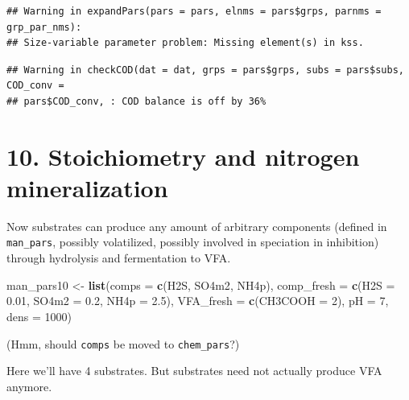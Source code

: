 \documentclass[
]{article}
\newenvironment{Shaded}{\begin{snugshade}}{\end{snugshade}}
\newcommand{\AttributeTok}[1]{\textcolor[rgb]{0.13,0.29,0.53}{#1}}
\newcommand{\DecValTok}[1]{\textcolor[rgb]{0.00,0.00,0.81}{#1}}
\newcommand{\FloatTok}[1]{\textcolor[rgb]{0.00,0.00,0.81}{#1}}
\newcommand{\FunctionTok}[1]{\textcolor[rgb]{0.13,0.29,0.53}{\textbf{#1}}}
\newcommand{\NormalTok}[1]{#1}
\newcommand{\OtherTok}[1]{\textcolor[rgb]{0.56,0.35,0.01}{#1}}
\newcommand{\StringTok}[1]{\textcolor[rgb]{0.31,0.60,0.02}{#1}}
\begin{document}
\begin{verbatim}
## Warning in expandPars(pars = pars, elnms = pars$grps, parnms = grp_par_nms):
## Size-variable parameter problem: Missing element(s) in kss.
\end{verbatim}

\begin{verbatim}
## Warning in checkCOD(dat = dat, grps = pars$grps, subs = pars$subs, COD_conv =
## pars$COD_conv, : COD balance is off by 36%
\end{verbatim}

\hypertarget{stoichiometry-and-nitrogen-mineralization}{%
\section{10. Stoichiometry and nitrogen
mineralization}\label{stoichiometry-and-nitrogen-mineralization}}

Now substrates can produce any amount of arbitrary components (defined
in \texttt{man\_pars}, possibly volatilized, possibly involved in
speciation in inhibition) through hydrolysis and fermentation to VFA.

\begin{Shaded}
\begin{Highlighting}[]
\NormalTok{man\_pars10 }\OtherTok{\textless{}{-}} \FunctionTok{list}\NormalTok{(}\AttributeTok{comps =} \FunctionTok{c}\NormalTok{(}\StringTok{\textquotesingle{}H2S\textquotesingle{}}\NormalTok{, }\StringTok{\textquotesingle{}SO4m2\textquotesingle{}}\NormalTok{, }\StringTok{\textquotesingle{}NH4p\textquotesingle{}}\NormalTok{),}
                   \AttributeTok{comp\_fresh =} \FunctionTok{c}\NormalTok{(}\AttributeTok{H2S =} \FloatTok{0.01}\NormalTok{, }\AttributeTok{SO4m2 =} \FloatTok{0.2}\NormalTok{, }\AttributeTok{NH4p =} \FloatTok{2.5}\NormalTok{), }
                   \AttributeTok{VFA\_fresh =} \FunctionTok{c}\NormalTok{(}\AttributeTok{CH3COOH =} \DecValTok{2}\NormalTok{),}
                   \AttributeTok{pH =} \DecValTok{7}\NormalTok{, }\AttributeTok{dens =} \DecValTok{1000}\NormalTok{)}
\end{Highlighting}
\end{Shaded}

(Hmm, should \texttt{comps} be moved to \texttt{chem\_pars}?)

Here we'll have 4 substrates. But substrates need not actually produce
VFA anymore.
\end{document}
